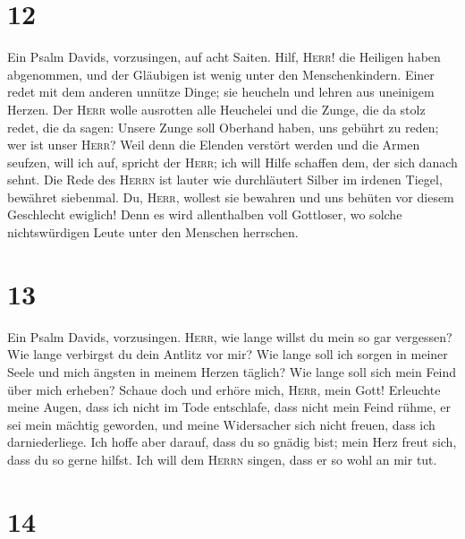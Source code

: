 \hypertarget{section-11}{%
\section{12}\label{section-11}}

 Ein Psalm Davids, vorzusingen, auf acht Saiten.
 Hilf, \textsc{Herr}! die Heiligen haben abgenommen, und
der Gläubigen ist wenig unter den Menschenkindern.  Einer
redet mit dem anderen unnütze Dinge; sie heucheln und lehren aus
uneinigem Herzen.  Der \textsc{Herr} wolle ausrotten alle
Heuchelei und die Zunge, die da stolz redet,  die da
sagen: Unsere Zunge soll Oberhand haben, uns gebührt zu reden; wer ist
unser \textsc{Herr}?  Weil denn die Elenden verstört
werden und die Armen seufzen, will ich auf, spricht der \textsc{Herr};
ich will Hilfe schaffen dem, der sich danach sehnt.  Die
Rede des \textsc{Herrn} ist lauter wie durchläutert Silber im irdenen
Tiegel, bewähret siebenmal.  Du, \textsc{Herr}, wollest
sie bewahren und uns behüten vor diesem Geschlecht ewiglich!
 Denn es wird allenthalben voll Gottloser, wo solche
nichtswürdigen Leute unter den Menschen herrschen.

\hypertarget{section-12}{%
\section{13}\label{section-12}}

 Ein Psalm Davids, vorzusingen. 
\textsc{Herr}, wie lange willst du mein so gar vergessen? Wie lange
verbirgst du dein Antlitz vor mir?  Wie lange soll ich
sorgen in meiner Seele und mich ängsten in meinem Herzen täglich? Wie
lange soll sich mein Feind über mich erheben?  Schaue doch
und erhöre mich, \textsc{Herr}, mein Gott! Erleuchte meine Augen, dass
ich nicht im Tode entschlafe,  dass nicht mein Feind
rühme, er sei mein mächtig geworden, und meine Widersacher sich nicht
freuen, dass ich darniederliege.  Ich hoffe aber darauf,
dass du so gnädig bist; mein Herz freut sich, dass du so gerne hilfst.
 Ich will dem \textsc{Herrn} singen, dass er so wohl an
mir tut.

\hypertarget{section-13}{%
\section{14}\label{section-13}}

